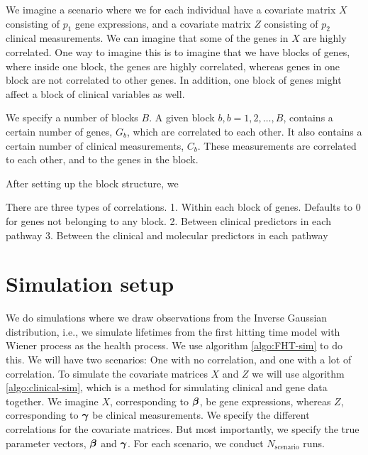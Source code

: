 We imagine a scenario where we for each individual have a covariate matrix $X$ consisting of $p_1$ gene expressions, and a
covariate matrix $Z$ consisting of $p_2$ clinical measurements.
We can imagine that some of the genes in $X$ are highly correlated. One way to imagine this is to imagine that we have blocks of genes,
where inside one block, the genes are highly correlated, whereas genes in one block are not correlated to other genes.
In addition, one block of genes might affect a block of clinical variables as well.

We specify a number of blocks $B$. A given block $b,b=1,2,\ldots,B$, contains a certain number of genes, $G_b$, which are correlated to each other.
It also contains a certain number of clinical measurements, $C_b$. These measurements are correlated to each other, and to the genes in the block.

After setting up the block structure, we 

There are three types of correlations.
1. Within each block of genes. Defaults to 0 for genes not belonging to any block.
2. Between clinical predictors in each pathway
3. Between the clinical and molecular predictors in each pathway


\section{Simulation setup}
We do simulations where we draw observations from the Inverse Gaussian distribution, i.e., we simulate lifetimes from the first hitting time model with Wiener process as the health process. We use algorithm \eqref{algo:FHT-sim} to do this. We will have two scenarios: One with no correlation, and one with a lot of correlation. To simulate the covariate matrices $X$ and $Z$ we will use algorithm \eqref{algo:clinical-sim}, which is a method for simulating clinical and gene data together. We imagine $X$, corresponding to $\boldsymbol{\beta}$, be gene expressions, whereas $Z$, corresponding to $\boldsymbol{\gamma}$ be clinical measurements. We specify the different correlations for the covariate matrices. But most importantly, we specify the true parameter vectors, $\boldsymbol{\beta}$ and $\boldsymbol{\gamma}$. For each scenario, we conduct $N_{\text{scenario}}$ runs.

